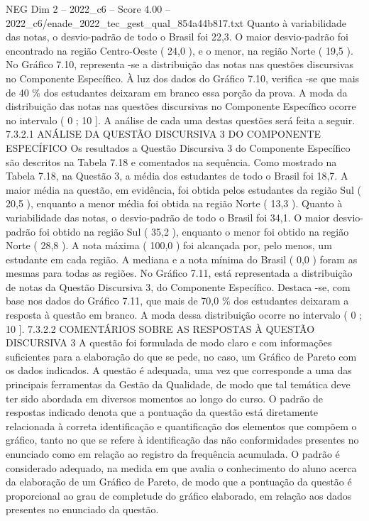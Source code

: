 \begin{textsample}{NEG Dim 2 – 2022\_c6 – Score 4.00 – 2022\_c6/enade\_2022\_tec\_gest\_qual\_854a44b817.txt}
Quanto à variabilidade das notas, o desvio-padrão de todo o Brasil foi 22,3.
O maior desvio-padrão foi encontrado na região Centro-Oeste ( 24,0 ), e o menor, na região Norte ( 19,5 ).
No Gráfico 7.10, representa -se a distribuição das notas nas questões discursivas no Componente Específico.
À luz dos dados do Gráfico 7.10, verifica -se que mais de 40 \% dos estudantes deixaram em branco essa porção da prova.
A moda da distribuição das notas nas questões discursivas no Componente Específico ocorre no intervalo ( 0 ; 10 ].
A análise de cada uma destas questões será feita a seguir. 7.3.2.1 ANÁLISE DA QUESTÃO DISCURSIVA 3 DO COMPONENTE ESPECÍFICO Os resultados a Questão Discursiva 3 do Componente Específico são descritos na Tabela 7.18 e comentados na sequência.
Como mostrado na Tabela 7.18, na Questão 3, a média dos estudantes de todo o Brasil foi 18,7.
A maior média na questão, em evidência, foi obtida pelos estudantes da região Sul ( 20,5 ), enquanto a menor média foi obtida na região Norte ( 13,3 ).
Quanto à variabilidade das notas, o desvio-padrão de todo o Brasil foi 34,1.
O maior desvio-padrão foi obtido na região Sul ( 35,2 ), enquanto o menor foi obtido na região Norte ( 28,8 ).
A nota máxima ( 100,0 ) foi alcançada por, pelo menos, um estudante em cada região.
A mediana e a nota mínima do Brasil ( 0,0 ) foram as mesmas para todas as regiões.
No Gráfico 7.11, está representada a distribuição de notas da Questão Discursiva 3, do Componente Específico.
Destaca -se, com base nos dados do Gráfico 7.11, que mais de 70,0 \% dos estudantes deixaram a resposta à questão em branco.
A moda dessa distribuição ocorre no intervalo ( 0 ; 10 ]. 7.3.2.2 COMENTÁRIOS SOBRE AS RESPOSTAS À QUESTÃO DISCURSIVA 3 A questão foi formulada de modo claro e com informações suficientes para a elaboração do que se pede, no caso, um Gráfico de Pareto com os dados indicados.
A questão é adequada, uma vez que corresponde a uma das principais ferramentas da Gestão da Qualidade, de modo que tal temática deve ter sido abordada em diversos momentos ao longo do curso.
O padrão de respostas indicado denota que a pontuação da questão está diretamente relacionada à correta identificação e quantificação dos elementos que compõem o gráfico, tanto no que se refere à identificação das não conformidades presentes no enunciado como em relação ao registro da frequência acumulada.
O padrão é considerado adequado, na medida em que avalia o conhecimento do aluno acerca da elaboração de um Gráfico de Pareto, de modo que a pontuação da questão é proporcional ao grau de completude do gráfico elaborado, em relação aos dados presentes no enunciado da questão.

\end{textsample}
